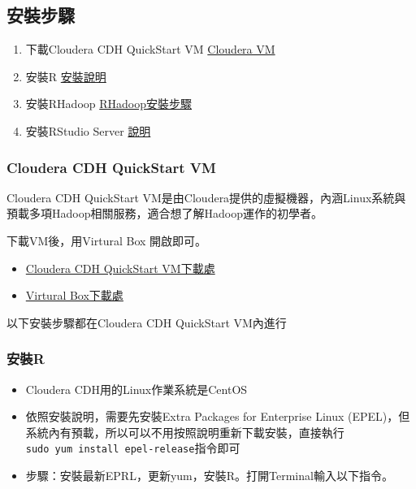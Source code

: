 \documentclass[]{book}
\providecommand{\tightlist}{%
  \setlength{\itemsep}{0pt}\setlength{\parskip}{0pt}}
\theoremstyle{definition}
\theoremstyle{definition}
\theoremstyle{remark}
\begin{document}
\subsection{安裝步驟}

\begin{enumerate}
\def\labelenumi{\arabic{enumi}.}
\tightlist
\item
  下載Cloudera CDH QuickStart VM
  \href{http://www.cloudera.com/developers/get-started-with-hadoop-tutorial.html}{Cloudera
  VM}
\item
  安裝R
  \href{https://cran.rstudio.com/bin/linux/redhat/README}{安裝說明}
\item
  安裝RHadoop
  \href{https://bigdatastudy.hackpad.com/ep/pad/static/IADMBeqF0vV}{RHadoop安裝步驟}
\item
  安裝RStudio Server
  \href{https://www.rstudio.com/products/rstudio/download-server/}{說明}
\end{enumerate}

\subsubsection{Cloudera CDH QuickStart
VM}\label{cloudera-cdh-quickstart-vm}

Cloudera CDH QuickStart
VM是由Cloudera提供的虛擬機器，內涵Linux系統與預載多項Hadoop相關服務，適合想了解Hadoop運作的初學者。

下載VM後，用Virtural Box 開啟即可。

\begin{itemize}
\tightlist
\item
  \href{http://www.cloudera.com/developers/get-started-with-hadoop-tutorial.html}{Cloudera
  CDH QuickStart VM下載處}
\item
  \href{https://www.virtualbox.org/}{Virtural Box下載處}
\end{itemize}

以下安裝步驟都在Cloudera CDH QuickStart VM內進行

\subsubsection{安裝R}\label{r}

\begin{itemize}
\tightlist
\item
  Cloudera CDH用的Linux作業系統是CentOS
\item
  依照安裝說明，需要先安裝Extra Packages for Enterprise Linux
  (EPEL)，但系統內有預載，所以可以不用按照說明重新下載安裝，直接執行\texttt{sudo\ yum\ install\ epel-release}指令即可
\item
  步驟：安裝最新EPRL，更新yum，安裝R。打開Terminal輸入以下指令。
\end{itemize}
\end{document}
